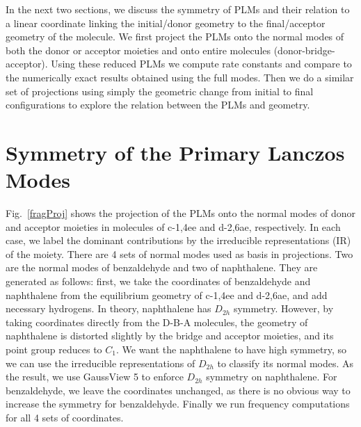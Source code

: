 In the next two sections, we discuss the symmetry  of PLMs and their relation to a linear coordinate linking the initial/donor geometry to the final/acceptor geometry of the molecule. We first project the PLMs onto the normal modes of both the donor or acceptor moieties
and onto entire molecules (donor-bridge-acceptor).  Using these reduced PLMs we
 compute rate constants and compare to the numerically exact results obtained using the full
modes.  Then we do a similar set of projections using simply the geometric change from initial to final configurations
to explore  the relation between the PLMs and geometry.



\section{Symmetry of the Primary Lanczos Modes}

Fig.~\ref{fragProj} shows the projection of the PLMs  onto the normal modes of
donor and acceptor moieties in molecules of c-1,4ee and d-2,6ae, respectively.
In each case, we label the dominant contributions by the
irreducible representations (IR) of the moiety.
There are 4 sets of normal modes used as basis in projections. Two are the normal modes of benzaldehyde and two of naphthalene. They are generated as follows: first, we take the  coordinates of benzaldehyde  and naphthalene from the equilibrium geometry of c-1,4ee and d-2,6ae, and add necessary hydrogens. In theory, naphthalene has $D_{2h}$ symmetry. However, by taking coordinates directly from the D-B-A molecules, the geometry of naphthalene is distorted slightly by the bridge and acceptor moieties, and its point group reduces to $C_{1}$. We want the naphthalene to have high symmetry, so we can use the irreducible representations of $D_{2h}$ to classify its normal modes. As the result, we use GaussView 5 to enforce $D_{2h}$ symmetry on naphthalene. For  benzaldehyde, we leave  the coordinates unchanged, as there is no obvious way to increase the symmetry for benzaldehyde. Finally we run frequency computations for all 4 sets of coordinates.

